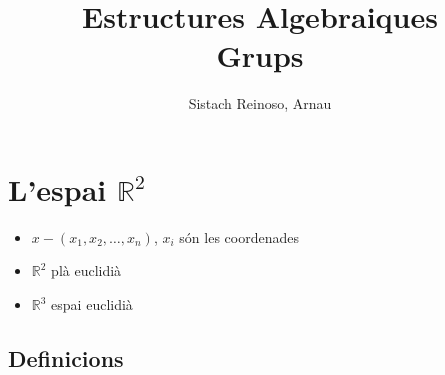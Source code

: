 \documentclass{article}
\title{Estructures Algebraiques\\Grups}
\author{Sistach Reinoso, Arnau}
\newcommand{\R}{\mathbb{R}}
\begin{document}
\maketitle
\tableofcontents
\newpage

\section{L'espai $\R^2$}
\begin{itemize}
\item $x - (x_1, x_2, \dots, x_n)$, $x_i$ són les coordenades
\item $\R^2$ plà euclidià
\item $\R^3$ espai euclidià
\end{itemize}

\subsection*{Definicions}
\end{document}
